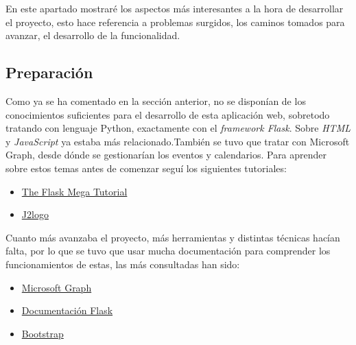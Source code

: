 
En este apartado mostraré los aspectos más interesantes a la hora de desarrollar el proyecto, esto hace referencia a problemas surgidos, los caminos tomados para avanzar, el desarrollo de la funcionalidad.

\subsection{Preparación}
Como ya se ha comentado en la sección anterior, no se disponían de los conocimientos suficientes para el desarrollo de esta aplicación web, sobretodo tratando con lenguaje Python, exactamente con el \textit{framework Flask}. Sobre \textit{HTML} y \textit{JavaScript} ya estaba más relacionado.También se tuvo que tratar con Microsoft Graph, desde dónde se gestionarían los eventos y calendarios.\newline
Para aprender sobre estos temas antes de comenzar seguí los siguientes tutoriales:\newline

\begin{itemize}
\item \href{https://blog.miguelgrinberg.com/post/the-flask-mega-tutorial-part-i-hello-world}{The Flask Mega Tutorial}\cite{flaskMegaTutorial}
\item \href{https://j2logo.com/tutorial-flask-espanol/}{J2logo}\cite{j2logo}
\end{itemize}
Cuanto más avanzaba el proyecto, más herramientas y distintas técnicas hacían falta, por lo que se tuvo que usar mucha documentación para comprender los funcionamientos de estas, las más consultadas han sido:
\begin{itemize}
\item \href{https://docs.microsoft.com/es-es/graph/api/overview?view=graph-rest-1.0}{Microsoft Graph}\cite{microsoftGraph}
\item \href{https://flask.palletsprojects.com/en/1.1.x/}{Documentación Flask}\cite{Flask}
\item \href{https://getbootstrap.com/docs/4.5/getting-started/introduction/}{Bootstrap}\cite{Bootstrap}
\end{itemize}


